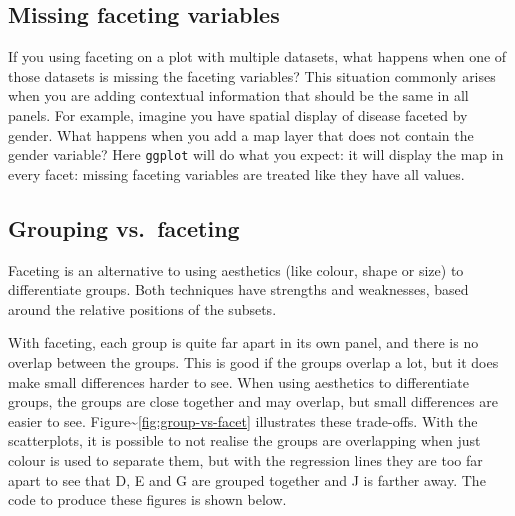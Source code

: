 \subsection{Missing faceting
variables}\label{sub:missing-faceting-columns}

If you using faceting on a plot with multiple datasets, what happens
when one of those datasets is missing the faceting variables? This
situation commonly arises when you are adding contextual information
that should be the same in all panels. For example, imagine you have
spatial display of disease faceted by gender. What happens when you add
a map layer that does not contain the gender variable? Here
\texttt{ggplot} will do what you expect: it will display the map in
every facet: missing faceting variables are treated like they have all
values. 

\subsection{Grouping vs.~faceting}\label{sub:group-vs-facet}

Faceting is an alternative to using aesthetics (like colour, shape or
size) to differentiate groups. Both techniques have strengths and
weaknesses, based around the relative positions of the subsets.
 

With faceting, each group is quite far apart in its own panel, and there
is no overlap between the groups. This is good if the groups overlap a
lot, but it does make small differences harder to see. When using
aesthetics to differentiate groups, the groups are close together and
may overlap, but small differences are easier to see.
Figure\textasciitilde{}\ref{fig:group-vs-facet} illustrates these
trade-offs. With the scatterplots, it is possible to not realise the
groups are overlapping when just colour is used to separate them, but
with the regression lines they are too far apart to see that D, E and G
are grouped together and J is farther away. The code to produce these
figures is shown below.

